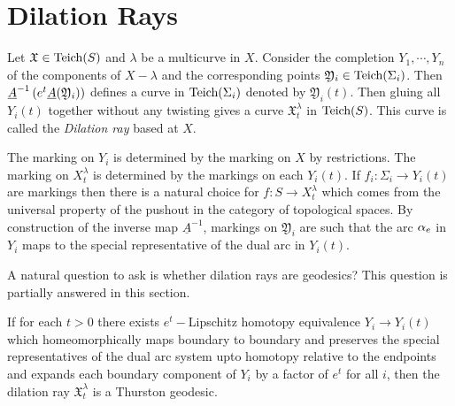 \section{Dilation Rays}
\begin{definition}
  Let $ \mathfrak{X}\in \text{Teich}(S)$ and $\lambda$ be a multicurve in $X$. Consider the completion $Y_1,\cdots, Y_n$ of the components of $X-\lambda$ and the corresponding points $ \mathfrak{Y}_i\in \text{Teich}(\Sigma_i)$. Then $\underline{A}^{-1}\left(e^t\underline{A}( \mathfrak{Y}_i)\right)$ defines a curve in $\text{Teich}(\Sigma_i)$ denoted by $ \mathfrak{Y}_i(t)$. Then gluing all $Y_i(t)$ together without any twisting gives a curve $ \mathfrak{X}^\lambda_t$ in $\text{Teich}(S)$. This curve is called the \textit{Dilation ray} based at $X$.
\end{definition}
\begin{rem}
  The marking on $Y_i$ is determined by the marking on $X$ by restrictions. The marking on $X^\lambda_t$ is determined by the markings on each $Y_i(t)$. If $f_i:\Sigma_i \to Y_i(t)$ are markings then there is a natural choice for $f:S \to X^\lambda_t$ which comes from the universal property of the pushout in the category of topological spaces. By construction of the inverse map $\underline{A}^{-1}$, markings on $ \mathfrak{Y}_i$ are such that the arc $\alpha_e$ in $Y_i$ maps to the special representative of the dual arc in $Y_i(t)$.  
\end{rem}
A natural question to ask is whether dilation rays are geodesics? This question is partially answered in this section. 
\begin{lemma}\label{lem:dilation}
  If for each $t>0$ there exists $e^t-$Lipschitz homotopy equivalence $Y_i\to Y_i(t)$ which homeomorphically maps boundary to boundary and preserves the special representatives of the dual arc system upto homotopy relative to the endpoints and expands each boundary component of $Y_i$ by a factor of $e^t$ for all $i$, then the dilation ray $ \mathfrak{X}^\lambda_t$ is a Thurston geodesic.
\end{lemma}
